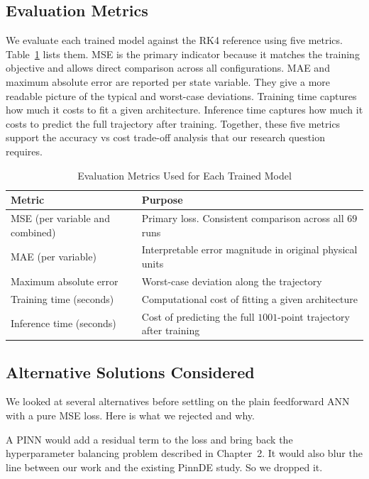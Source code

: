 \subsection{Evaluation Metrics}

We evaluate each trained model against the RK4 reference using five metrics. Table~\ref{tab:metrics} lists them. MSE is the primary indicator because it matches the training objective and allows direct comparison across all configurations. MAE and maximum absolute error are reported per state variable. They give a more readable picture of the typical and worst-case deviations. Training time captures how much it costs to fit a given architecture. Inference time captures how much it costs to predict the full trajectory after training. Together, these five metrics support the accuracy vs cost trade-off analysis that our research question requires.

\begin{table}[H]
\centering
\caption{Evaluation Metrics Used for Each Trained Model}
\label{tab:metrics}
\renewcommand{\arraystretch}{1.2}
\begin{tabular}{|l|p{9.5cm}|}
\hline
\textbf{Metric} & \textbf{Purpose} \\
\hline
MSE (per variable and combined) & Primary loss. Consistent comparison across all $69$ runs \\
\hline
MAE (per variable) & Interpretable error magnitude in original physical units \\
\hline
Maximum absolute error & Worst-case deviation along the trajectory \\
\hline
Training time (seconds) & Computational cost of fitting a given architecture \\
\hline
Inference time (seconds) & Cost of predicting the full $1001$-point trajectory after training \\
\hline
\end{tabular}
\end{table}

\subsection{Alternative Solutions Considered}

We looked at several alternatives before settling on the plain feedforward ANN with a pure MSE loss. Here is what we rejected and why.

A PINN would add a residual term to the loss and bring back the hyperparameter balancing problem described in Chapter~2. It would also blur the line between our work and the existing PinnDE study. So we dropped it.

